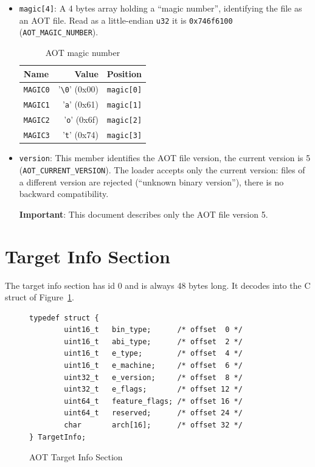 \documentclass{article}
\begin{document}
\begin{itemize}
    \item \verb|magic[4]|: A 4 bytes array holding a ``magic number'', identifying the file as an AOT file.
        Read as a little-endian \verb|u32| it is \verb|0x746f6100| (\verb|AOT_MAGIC_NUMBER|).
        \begin{table}[H]
        \centering
        \begin{tabular}{lrl}
            \hline
            Name & Value & Position \\
            \hline
            \verb|MAGIC0| & '\verb|\0|' (0x00) & \verb|magic[0]| \\
            \verb|MAGIC1| & '\verb|a|' (0x61)  & \verb|magic[1]| \\
            \verb|MAGIC2| & '\verb|o|' (0x6f)  & \verb|magic[2]| \\
            \verb|MAGIC3| & '\verb|t|' (0x74)  & \verb|magic[3]| \\
            \hline
        \end{tabular}
        \caption{AOT magic number}
        \end{table}

    \item \verb|version|: This member identifies the AOT file version, the current version is 5 (\verb|AOT_CURRENT_VERSION|).
        The loader accepts only the current version: files of a different version are rejected (``unknown binary version''), there is no backward compatibility.

        \medskip
        \textbf{Important}: This document describes only the AOT file version 5.
\end{itemize}

\section{Target Info Section} \label{sec:target-info}

The target info section has id 0 and is always 48 bytes long. It decodes into the C struct of Figure~\ref{fig:target-info}.

\begin{figure}[H]
\begin{verbatim}
typedef struct {
        uint16_t   bin_type;      /* offset  0 */
        uint16_t   abi_type;      /* offset  2 */
        uint16_t   e_type;        /* offset  4 */
        uint16_t   e_machine;     /* offset  6 */
        uint32_t   e_version;     /* offset  8 */
        uint32_t   e_flags;       /* offset 12 */
        uint64_t   feature_flags; /* offset 16 */
        uint64_t   reserved;      /* offset 24 */
        char       arch[16];      /* offset 32 */
} TargetInfo;
\end{verbatim}
\caption{AOT Target Info Section}
\label{fig:target-info}
\end{figure}
\end{document}
